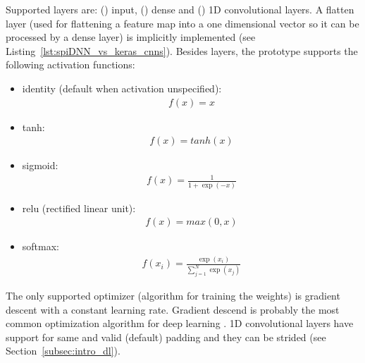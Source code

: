 \documentclass[]{article}
\begin{document}
Supported layers are: () input,
() dense and () 1D convolutional layers.
A flatten layer (used for flattening a feature map into a one
dimensional vector so it can be processed by a dense layer) is
implicitly implemented (see Listing~\ref{lst:spiDNN_vs_keras_cnns}).
Besides layers, the prototype supports the following activation
functions:
\begin{itemize}
  \item identity (default when activation unspecified):
    \begin{align}
      f(x) = x
    \end{align}
  \item tanh:
    \begin{align}
      f(x) = tanh(x)
    \end{align}
  \item sigmoid:
    \begin{align}
      f(x) = \frac{1}{1 + \exp(-x)}
    \end{align}
  \item relu (rectified linear unit):
    \begin{align}
      f(x) = max(0, x)
    \end{align}
  \item softmax:
    \begin{align}
      \label{eq:softmax}
      f(x_i) = \frac{\exp(x_i)}{\sum_{j=1}^{N}\exp(x_j)}
    \end{align}
\end{itemize}
The only supported optimizer (algorithm for training the weights) is
gradient descent with a constant learning rate.
Gradient descend is probably the most common optimization algorithm
for deep learning \citep{goodfellow_et_al_2016}.
1D convolutional layers have support for same and valid (default)
padding and they can be strided (see Section~\ref{subsec:intro_dl}).
\end{document}
